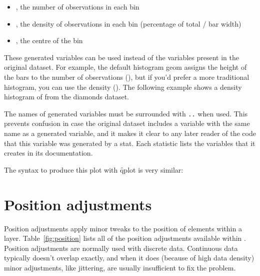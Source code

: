 \begin{itemize}
  \item {}, the number of observations in each bin
  \item {}, the density of observations in each bin (percentage of total / bar width)
  \item {}, the centre of the bin
\end{itemize}

These generated variables can be used instead of the variables present in the original dataset.  For example, the default histogram geom assigns the height of the bars to the number of observations (), but if you'd prefer a more traditional histogram, you can use the density ().   The following example shows a density histogram of  from the diamonds dataset.

% 


The names of generated variables must be surrounded with {\tt ..} when used.  This prevents confusion in case the original dataset includes a variable with the same name as a generated variable, and it makes it clear to any later reader of the code that this variable was generated by a stat.  Each statistic lists the variables that it creates in its documentation.

The syntax to produce this plot with \f{qplot} is very similar:

% 


\section{Position adjustments}
\label{sec:position}

Position adjustments apply minor tweaks to the position of elements within a layer.  Table~\ref{fig:position} lists all of the position adjustments available within \ggplot.  Position adjustments are normally used with discrete data.  Continuous data typically doesn't overlap exactly, and when it does (because of high data density) minor adjustments, like jittering, are usually insufficient to fix the problem.

